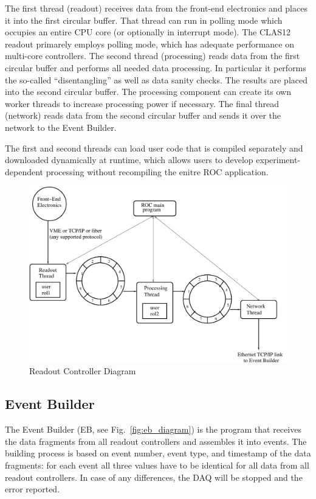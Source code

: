 The first thread (readout) receives data from the front-end electronics and places it into the first circular buffer. That thread can run in polling mode which occupies an entire CPU core (or optionally in interrupt mode). The CLAS12 readout primarely employs polling mode, which has adequate performance on multi-core controllers. The second thread (processing) reads data from the first circular buffer and performs all needed data processing. In particular it performs the so-called ``disentangling'' as well as data sanity checks. The results are placed into the second circular buffer. The processing component can create its own worker threads to increase processing power if necessary. The final thread (network) reads data from the second circular buffer and sends it over the network to the Event Builder.

The first and second threads can load user code that is compiled separately and downloaded dynamically at runtime, which allows users to develop experiment-dependent processing without recompiling the enitre ROC application.

\begin{figure}[hbt]
	\centering
	\includegraphics[width=1.0\columnwidth,keepaspectratio]{img/roc_diagram.pdf}
	\caption{Readout Controller Diagram}
	\label{fig:roc_diagram}
\end{figure}


\subsection{Event Builder}

The Event Builder (EB, see Fig.~\ref{fig:eb_diagram}) is the program that receives the data fragments from all readout controllers and assembles it into events. The building process is based on event number, event type, and timestamp of the data fragments: for each event all three values have to be identical for all data from all readout controllers. In case of any differences, the DAQ will be stopped and the error reported.

